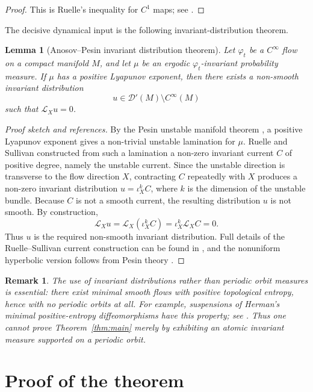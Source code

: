\documentclass{article}
\newtheorem{lemma}{Lemma}
\newtheorem{remark}{Remark}
\theoremstyle{definition}
\newcommand{\cD}{\mathcal{D}}
\newcommand{\cL}{\mathcal{L}}
\begin{document}
\begin{proof}
This is Ruelle's inequality for $C^1$ maps; see \cite{KH, Rue}.
\end{proof}

The decisive dynamical input is the following invariant-distribution theorem.

\begin{lemma}[Anosov--Pesin invariant distribution theorem]\label{lem:anosov-pesin}
Let $\varphi_t$ be a $C^\infty$ flow on a compact manifold $M$, and let
$\mu$ be an ergodic $\varphi_t$-invariant probability measure. If $\mu$ has
a positive Lyapunov exponent, then there exists a non-smooth invariant
distribution
\[
u\in \cD'(M)\setminus C^\infty(M)
\]
such that $\cL_X u=0$.
\end{lemma}

\begin{proof}[Proof sketch and references]
By the Pesin unstable manifold theorem \cite{Pesin}, a positive Lyapunov
exponent gives a non-trivial unstable lamination for $\mu$. Ruelle and
Sullivan \cite{RS} constructed from such a lamination a non-zero invariant
current $C$ of positive degree, namely the unstable current. Since the
unstable direction is transverse to the flow direction $X$, contracting
$C$ repeatedly with $X$ produces a non-zero invariant distribution
$u=\iota_X^k C$, where $k$ is the dimension of the unstable bundle. Because
$C$ is not a smooth current, the resulting distribution $u$ is not smooth.
By construction,
\[
\cL_X u=\cL_X(\iota_X^k C)=\iota_X^k \cL_X C=0.
\]
Thus $u$ is the required non-smooth invariant distribution. Full details of
the Ruelle--Sullivan current construction can be found in \cite{RS}, and
the nonuniform hyperbolic version follows from Pesin theory \cite{Pesin}.
\end{proof}

\begin{remark}
The use of invariant distributions rather than periodic orbit measures is
essential: there exist minimal smooth flows with positive topological
entropy, hence with no periodic orbits at all. For example, suspensions of
Herman's minimal positive-entropy diffeomorphisms have this property; see
\cite{exa}. Thus one cannot prove Theorem~\ref{thm:main} merely by
exhibiting an atomic invariant measure supported on a periodic orbit.
\end{remark}

\section{Proof of the theorem}
\end{document}
